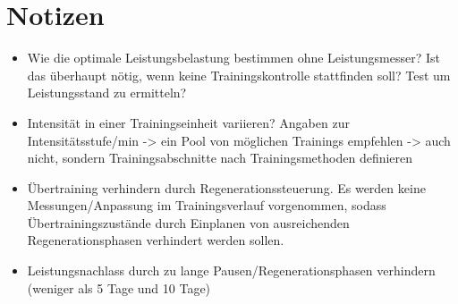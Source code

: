 \section{Notizen}
\begin{itemize}
    \item Wie die optimale Leistungsbelastung bestimmen ohne Leistungsmesser? Ist das überhaupt nötig, wenn keine Trainingskontrolle stattfinden soll? Test um Leistungsstand zu ermitteln?
    \item Intensität in einer Trainingseinheit variieren? Angaben zur Intensitätsstufe/min -> ein Pool von möglichen Trainings empfehlen -> auch nicht, sondern Trainingsabschnitte nach Trainingsmethoden definieren
    \item Übertraining verhindern durch Regenerationssteuerung. Es werden keine Messungen/Anpassung im Trainingsverlauf vorgenommen, sodass Übertrainingszustände durch Einplanen von ausreichenden Regenerationsphasen verhindert werden sollen.
    \item Leistungsnachlass durch zu lange Pausen/Regenerationsphasen verhindern (weniger als 5 Tage und 10 Tage)
\end{itemize}
